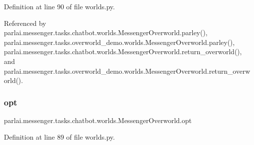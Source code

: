 Definition at line 90 of file worlds.\+py.



Referenced by parlai.\+messenger.\+tasks.\+chatbot.\+worlds.\+Messenger\+Overworld.\+parley(), parlai.\+messenger.\+tasks.\+overworld\+\_\+demo.\+worlds.\+Messenger\+Overworld.\+parley(), parlai.\+messenger.\+tasks.\+chatbot.\+worlds.\+Messenger\+Overworld.\+return\+\_\+overworld(), and parlai.\+messenger.\+tasks.\+overworld\+\_\+demo.\+worlds.\+Messenger\+Overworld.\+return\+\_\+overworld().

\mbox{\label{classparlai_1_1messenger_1_1tasks_1_1chatbot_1_1worlds_1_1MessengerOverworld_ab36fce9d2786910417356427e8716cb3}} 
\subsubsection{\texorpdfstring{opt}{opt}}
{\footnotesize\ttfamily parlai.\+messenger.\+tasks.\+chatbot.\+worlds.\+Messenger\+Overworld.\+opt}



Definition at line 89 of file worlds.\+py.



